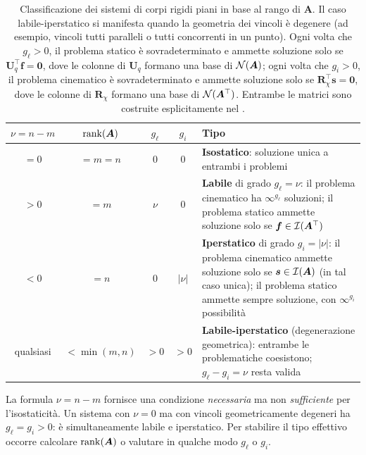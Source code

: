 \begin{table}[htbp]
	\centering
	\renewcommand{\arraystretch}{1.8}
	\small
	\begin{tabular}{cccc p{5.5cm}}
		\toprule
		$\nu = n - m$ & $\operatorname{rank}(\bm{A})$
		& $g_\ell$ & $g_i$ & Tipo\\
		\midrule
		$= 0$ & $= m = n$ & $0$ & $0$
		& \textbf{Isostatico}: soluzione unica
		a entrambi i problemi\\
		$> 0$ & $= m$ & $\nu$ & $0$
		& \textbf{Labile} di grado $g_\ell = \nu$:
		il problema cinematico ha $\infty^{g_\ell}$
		soluzioni; il problema statico ammette
		soluzione solo se $\bm{f} \in \mathcal{I}(\bm{A}^{\top})$\\
		$< 0$ & $= n$ & $0$ & $|\nu|$
		& \textbf{Iperstatico} di grado $g_i = |\nu|$: il problema
		cinematico ammette soluzione solo se $\bm{s} \in \mathcal{I}(\bm{A})$
		(in tal caso unica); il problema statico ammette sempre
		soluzione, con $\infty^{g_i}$ possibilità\\
		\multirow{2}{*}{qualsiasi}
		& \multirow{2}{*}{$< \min(m, n)$}
		& \multirow{2}{*}{$> 0$}
		& \multirow{2}{*}{$> 0$}
		& \textbf{Labile-iperstatico}
		(degenerazione geometrica): entrambe le
		problematiche coesistono;
		$g_\ell - g_i = \nu$ resta valida\\
		\bottomrule
	\end{tabular}
	\caption{Classificazione dei sistemi di corpi rigidi piani in base	al rango di $\bm{A}$. Il caso labile-iperstatico si manifesta quando la geometria dei vincoli è degenere (ad esempio, vincoli 	tutti paralleli o tutti concorrenti in un punto). Ogni volta che 	$g_\ell > 0$, il problema statico è sovradeterminato e ammette	soluzione solo se $\bm{U}_q^{\top}\bm{f}=\bm{0}$, dove le		colonne di $\bm{U}_q$ formano una base di $\mathcal{N}(\bm{A})$; ogni	volta che $g_i > 0$, il problema cinematico è	sovradeterminato e ammette soluzione solo se $\bm{R}_\chi^{\top}\bm{s}=\bm{0}$, dove le colonne di		$\bm{R}_\chi$ formano una base di $\mathcal{N}(\bm{A}^\top)$. Entrambe	le matrici sono costruite esplicitamente nel	.}
	\label{tab:classificazione_SCR}
\end{table}

\begin{oss}
	La formula $\nu = n - m$ fornisce una condizione
	\emph{necessaria} ma non \emph{sufficiente} per
	l'isostaticità. Un sistema con $\nu = 0$ ma con vincoli
	geometricamente degeneri ha $g_\ell = g_i > 0$:
	è simultaneamente labile e iperstatico. Per stabilire
	il tipo effettivo occorre calcolare $\operatorname{rank}(\bm{A})$ o valutare in qualche modo
	$g_\ell$ o $g_i $.
	
\end{oss}



